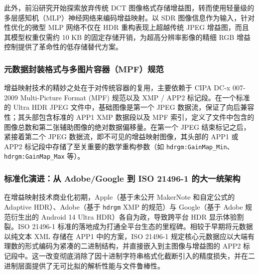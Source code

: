 \documentclass[12pt, a4paper]{ctexart}
\begin{document}
此外，前沿研究开始探索放弃传统 DCT 图像格式存储增益图，转而使用轻量级的多层感知机（MLP）神经网络来编码增益映射。以 SDR 图像信息作为输入，针对性优化的微型 MLP 网络不仅在 HDR 重构表现上超越传统 JPEG 增益图，而且其模型权重仅需约 10 KB 的固定存储开销，为超高分辨率影像的精细 RGB 增益控制提供了革命性的低存储替代方案。

\subsubsection{元数据封装格式与多图片容器（MPF）规范}

增益映射技术的精妙之处在于对传统容器的复用，主要依赖于 CIPA DC-x 007-2009 Multi-Picture Format (MPF) 规范以及 XMP / APP2 标记段。在一个标准的 Ultra HDR JPEG 文件中，基础图像是第一个 JPEG 数据流，保证了向后兼容性；其头部包含标准的 APP1 XMP 数据段以及 MPF 索引，定义了文件中包含的图像总数和第二张辅助图像的绝对数据偏移量。在第一个 JPEG 结束标记之后，紧接着第二个 JPEG 数据流，即不可见的增益映射图像，其头部的 APP1 或 APP2 标记段中存储了至关重要的数学重构参数（如 \texttt{hdrgm:GainMap\_Min}、\texttt{hdrgm:GainMap\_Max} 等）。

\subsubsection{标准化演进：从 Adobe/Google 到 ISO 21496-1 的大一统架构}

在增益映射技术商业化初期，Apple（基于未公开 MakerNote 和自定公式的 Adaptive HDR）、Adobe（基于 \texttt{hdrgm} XMP 的规范）与 Google（基于 Adobe 规范衍生出的 Android 14 Ultra HDR）各自为政，导致跨平台 HDR 显示体验割裂。ISO 21496-1 标准的落地成为打通全平台生态的里程碑。相较于早期将元数据以纯文本 XML 存储在 APP1 中的方案，ISO 21496-1 规定核心元数据应以大端有理数的形式编码为紧凑的二进制结构，并直接嵌入到主图像与增益图的 APP2 标记段中。这一改变彻底消除了因十进制字符串格式化截断引入的精度损失，并在二进制层面提供了无可比拟的解析性能与文件鲁棒性。
\end{document}
